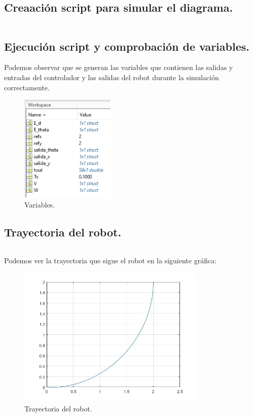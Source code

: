 \documentclass[a4paper, 12pt]{article}
\begin{document}
	\subsection{Creaación script para simular el diagrama.}
		\inputminted[fontsize=\scriptsize, linenos, breaklines=true, xleftmargin=0.75cm, frame=lines]{matlab}{code/parte2/EjerB.m}
	
	\newpage
	\subsection{Ejecución script y comprobación de variables.}
		Podemos observar que se generan las variables que contienen las salidas y entradas del controlador y las salidas del robot durante la simulación correctamente.
		\begin{figure}[htp!]
			\centering
			\includegraphics[width=0.4\textwidth]{figures/parte2/ejerC.png}
			\caption{Variables.}
		\end{figure}
	
	\newpage
	\subsection{Trayectoria del robot.}
		\inputminted[fontsize=\scriptsize, linenos, breaklines=true, xleftmargin=0.75cm, frame=lines]{matlab}{code/parte2/EjerD.m}
		Podemos ver la trayectoria que sigue el robot en la siguiente gráfica:
		\begin{figure}[htp!]
			\centering
			\includegraphics[width=0.8\textwidth]{figures/parte2/ejerD.jpg}
			\caption{Trayectoria del robot.}
		\end{figure}
	\newpage
	
\end{document}
